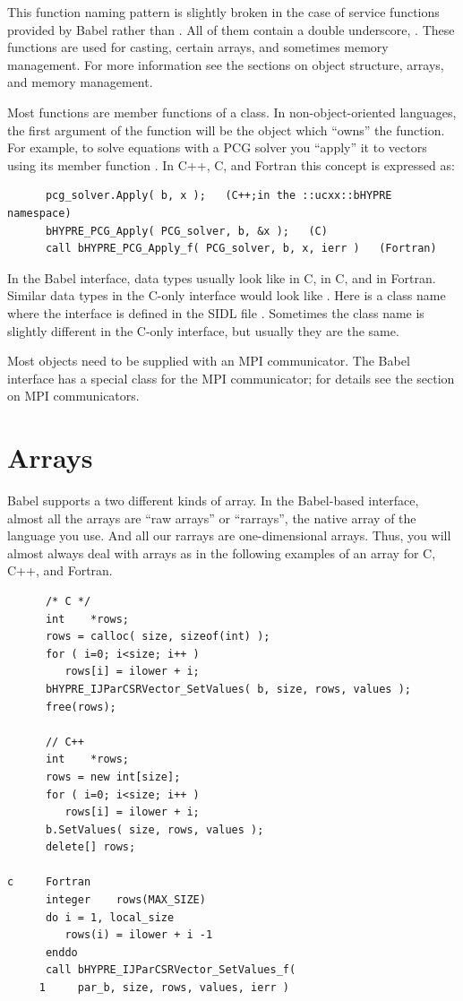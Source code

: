 This function naming pattern is slightly broken in the case of service
functions provided by Babel rather than \hypre{}.  All of them contain
a double underscore, \code{__}.  These functions are used for casting,
certain arrays, and sometimes memory management.  For more information
see the sections on object structure, arrays, and memory management.

Most functions are member functions of a class.  In
non-object-oriented languages, the first argument of the function will
be the object which ``owns'' the function.  For example, to solve
equations with a PCG solver you ``apply'' it to vectors using its
member function .  In C++, C, and Fortran this concept is
expressed as:
\begin{verbatim}
      pcg_solver.Apply( b, x );   (C++;in the ::ucxx::bHYPRE namespace)
      bHYPRE_PCG_Apply( PCG_solver, b, &x );   (C)
      call bHYPRE_PCG_Apply_f( PCG_solver, b, x, ierr )   (Fortran)
\end{verbatim}

In the Babel interface, data types usually look like  in
C,  in C, and  in Fortran.  Similar
data types in the C-only interface would look like
.  Here  is a class name where the
interface is defined in the SIDL file .
Sometimes the class name is slightly different in the C-only
interface, but usually they are the same.

Most \hypre{} objects need to be supplied with an MPI communicator.
The Babel interface has a special class for the MPI communicator; for
details see the section on MPI communicators.

\section{Arrays}
Babel supports a two different kinds of array.  In the \hypre{}
Babel-based interface, almost all the arrays are ``raw arrays'' or
``rarrays'', the native array of the language you use.  And all our
rarrays are one-dimensional arrays.  Thus, you will almost always deal
with arrays as in the following examples of an array  for
C, C++, and Fortran.

\begin{verbatim}
      /* C */
      int    *rows;
      rows = calloc( size, sizeof(int) );
      for ( i=0; i<size; i++ )
         rows[i] = ilower + i;
      bHYPRE_IJParCSRVector_SetValues( b, size, rows, values );
      free(rows);

      // C++
      int    *rows;
      rows = new int[size];
      for ( i=0; i<size; i++ )
         rows[i] = ilower + i;
      b.SetValues( size, rows, values );
      delete[] rows;

c     Fortran
      integer    rows(MAX_SIZE)
      do i = 1, local_size
         rows(i) = ilower + i -1
      enddo
      call bHYPRE_IJParCSRVector_SetValues_f(
     1     par_b, size, rows, values, ierr )
\end{verbatim}

